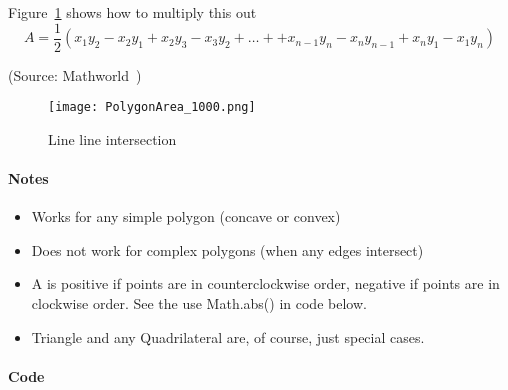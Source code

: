Figure~\ref{fig:polygonareadeterminant} shows how to multiply this out
\[
    A = \frac{1}{2} \left(
        x_1 y_2 - x_2 y_1
      + x_2 y_3 - x_3 y_2
      + \ldots +
      + x_{n-1} y_n - x_n y_{n-1}
      + x_{n} y_1 - x_1 y_n
      \right)
\]

(Source: Mathworld~\cite{mathworldpolygonarea})

\begin{figure}
    \centering
    \texttt{[image: PolygonArea\_1000.png]}
    \caption{Line line intersection}
    \label{fig:polygonareadeterminant}
\end{figure}

\paragraph{Notes}
\begin{itemize}
\item Works for any simple polygon (concave or convex)
\item Does not work for complex polygons (when any edges intersect)
\item A is positive if points are in counterclockwise order, negative if points are in clockwise order.
    See the use Math.abs() in code below.
\item Triangle and any Quadrilateral are, of course, just special cases.
\end{itemize}

\paragraph{Code}
\inputminted{java}{code/polygonarea.java}

